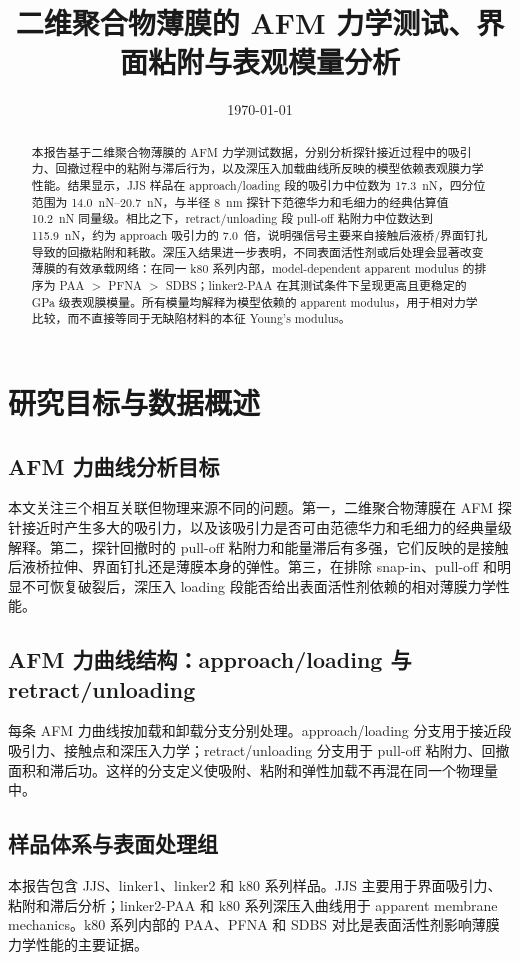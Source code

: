 \documentclass[UTF8,11pt,fontset=fandol]{ctexart}
\title{二维聚合物薄膜的 AFM 力学测试、界面粘附与表观模量分析}
\author{}
\date{\today}
\begin{document}
\maketitle

\begin{abstract}
本报告基于二维聚合物薄膜的 AFM 力学测试数据，分别分析探针接近过程中的吸引力、回撤过程中的粘附与滞后行为，以及深压入加载曲线所反映的模型依赖表观膜力学性能。结果显示，JJS 样品在 approach/loading 段的吸引力中位数为 \SI{17.3}{nN}，四分位范围为 \SIrange{14.0}{20.7}{nN}，与半径 \SI{8}{nm} 探针下范德华力和毛细力的经典估算值 \SI{10.2}{nN} 同量级。相比之下，retract/unloading 段 pull-off 粘附力中位数达到 \SI{115.9}{nN}，约为 approach 吸引力的 \SI{7.0}{倍}，说明强信号主要来自接触后液桥/界面钉扎导致的回撤粘附和耗散。深压入结果进一步表明，不同表面活性剂或后处理会显著改变薄膜的有效承载网络：在同一 k80 系列内部，model-dependent apparent modulus 的排序为 PAA $>$ PFNA $>$ SDBS；linker2-PAA 在其测试条件下呈现更高且更稳定的 GPa 级表观膜模量。所有模量均解释为模型依赖的 apparent modulus，用于相对力学比较，而不直接等同于无缺陷材料的本征 Young's modulus。
\end{abstract}

\tableofcontents
\clearpage

\section{研究目标与数据概述}
\subsection{AFM 力曲线分析目标}
本文关注三个相互关联但物理来源不同的问题。第一，二维聚合物薄膜在 AFM 探针接近时产生多大的吸引力，以及该吸引力是否可由范德华力和毛细力的经典量级解释。第二，探针回撤时的 pull-off 粘附力和能量滞后有多强，它们反映的是接触后液桥拉伸、界面钉扎还是薄膜本身的弹性。第三，在排除 snap-in、pull-off 和明显不可恢复破裂后，深压入 loading 段能否给出表面活性剂依赖的相对薄膜力学性能。

\subsection{AFM 力曲线结构：approach/loading 与 retract/unloading}
每条 AFM 力曲线按加载和卸载分支分别处理。approach/loading 分支用于接近段吸引力、接触点和深压入力学；retract/unloading 分支用于 pull-off 粘附力、回撤面积和滞后功。这样的分支定义使吸附、粘附和弹性加载不再混在同一个物理量中。

\subsection{样品体系与表面处理组}
本报告包含 JJS、linker1、linker2 和 k80 系列样品。JJS 主要用于界面吸引力、粘附和滞后分析；linker2-PAA 和 k80 系列深压入曲线用于 apparent membrane mechanics。k80 系列内部的 PAA、PFNA 和 SDBS 对比是表面活性剂影响薄膜力学性能的主要证据。
\end{document}
